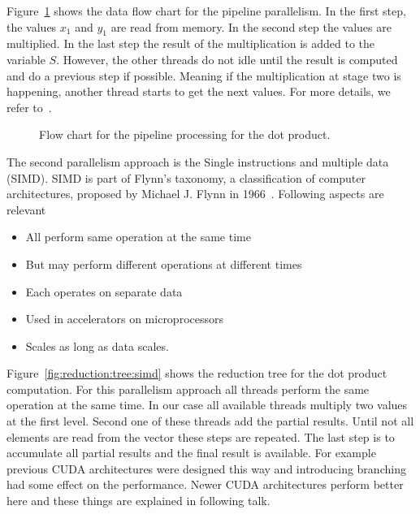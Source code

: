 Figure~\ref{fig:dataflow:pipeline} shows the data flow chart for the pipeline parallelism. In the first step, the values $x_1$ and $y_1$ are read from memory. In the second step the values are multiplied. In the last step the result of the multiplication is added to the variable $S$. However, the other threads do not idle until the result is computed and do a previous step if possible. Meaning if the multiplication at stage two is happening, another thread starts to get the next values. For more details, we refer to~\cite{quinn2003parallel}. \\


\begin{figure}[tb]
\centering
{}
\caption{Flow chart for the pipeline processing for the dot product.}
\label{fig:dataflow:pipeline}
\end{figure}

The second parallelism approach is the Single instructions and multiple data (SIMD). SIMD is part of Flynn's taxonomy, a classification of computer architectures, proposed by Michael J. Flynn in 1966~\cite{flynn1972some,duncan1990survey}. Following aspects are relevant 
\begin{itemize}
\item All perform same operation at the same time
\item But may perform different operations at different times
\item Each operates on separate data
\item Used in accelerators on microprocessors
\item Scales as long as data scales.
\end{itemize}
\vspace{0.25cm}
Figure~\ref{fig:reduction:tree:simd} shows the reduction tree for the dot product computation. For this parallelism approach all threads perform the same operation at the same time. In our case all available threads multiply two values at the first level. Second one of these threads add the partial results. Until not all elements are read from the vector these steps are repeated. The last step is to accumulate all partial results and the final result is available. For example previous CUDA architectures were designed this way and introducing branching had some effect on the performance. Newer CUDA architectures perform better here and these things are explained in following talk.

